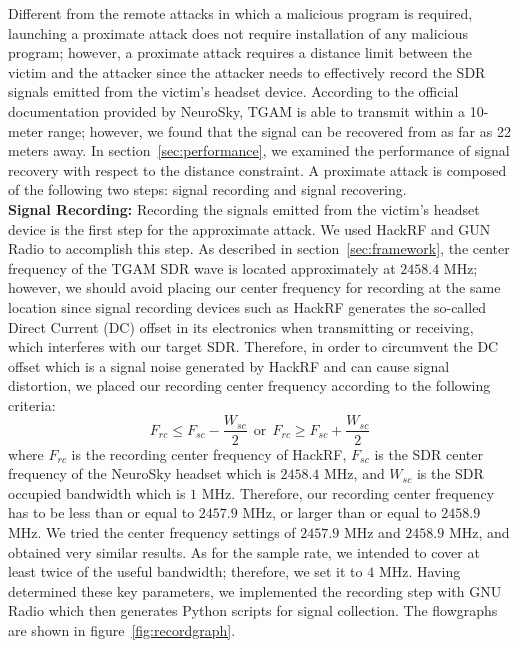 Different from the remote attacks in which a malicious program is required, launching a proximate attack does not require installation of any malicious program; however, a proximate attack requires a distance limit between the victim and the attacker since the attacker needs to effectively record the SDR signals emitted from the victim's headset device. According to the official documentation provided by NeuroSky, TGAM is able to transmit within a 10-meter range; however, we found that the signal can be recovered from as far as 22 meters away. In section~\ref{sec:performance}, we examined the performance of signal recovery with respect to the distance constraint. A proximate attack is composed of the following two steps: signal recording and signal recovering.\\
%
\indent \textbf{Signal Recording:} Recording the signals emitted from the victim's headset device is the first step for the approximate attack. We used HackRF and GUN Radio to accomplish this step. As described in section~\ref{sec:framework}, the center frequency of the TGAM SDR wave is located approximately at $2458.4$ MHz; however, we should avoid placing our center frequency for recording at the same location since signal recording devices such as HackRF generates the so-called Direct Current (DC) offset in its electronics when transmitting or receiving, which interferes with our target SDR. Therefore, in order to circumvent the DC offset which is a signal noise generated by HackRF and can cause signal distortion, we placed our recording center frequency according to the following criteria:
\begin{equation}
F_{rc} \leq F_{sc} - \frac{W_{sc}}{2}\ \ \mbox{or}\ \ F_{rc} \geq F_{sc} + \frac{W_{sc}}{2}
\end{equation}
where $F_{rc}$ is the recording center frequency of HackRF, $F_{sc}$ is the SDR center frequency of the NeuroSky headset which is $2458.4$ MHz, and $W_{sc}$ is the SDR occupied bandwidth which is $1$ MHz. Therefore, our recording center frequency has to be less than or equal to $2457.9$ MHz, or larger than or equal to $2458.9$ MHz. We tried the center frequency settings of $2457.9$ MHz and $2458.9$ MHz, and obtained very similar results. As for the sample rate, we intended to cover at least twice of the useful bandwidth; therefore, we set it to $4$ MHz. Having determined these key parameters, we implemented the recording step with GNU Radio which then generates Python scripts for signal collection. The flowgraphs are shown in figure~\ref{fig:recordgraph}.\\
